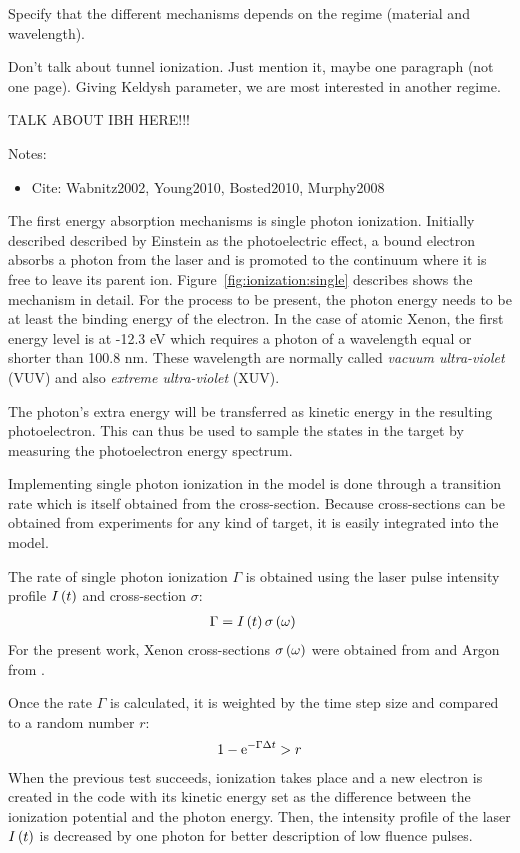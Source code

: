 Specify that the different mechanisms depends on the regime (material and
wavelength).

Don't talk about tunnel ionization. Just mention it, maybe one paragraph (not
one page). Giving Keldysh parameter, we are most interested in another regime.

TALK ABOUT IBH HERE!!!


Notes:
\begin{itemize}
\item Cite: Wabnitz2002, Young2010, Bosted2010, Murphy2008
\end{itemize}

The first energy absorption mechanisms is single photon ionization. Initially
described described by Einstein as the photoelectric effect, a bound electron
absorbs a photon from the laser and is promoted to the continuum where it is
free to leave its parent ion. Figure~\ref{fig:ionization:single} describes
shows the mechanism in detail. For the process to be present, the photon energy
needs to be at least the binding energy of the electron. In the case of
atomic Xenon, the first energy level is at -12.3 eV which requires a photon
of a wavelength equal or shorter than 100.8 nm. These wavelength are normally
called \textit{vacuum ultra-violet} (VUV) and also \textit{extreme
ultra-violet} (XUV).


The photon's extra energy will be transferred as kinetic energy in the
resulting photoelectron. This can thus be used to sample the states in the
target by measuring the photoelectron energy spectrum.

Implementing single photon ionization in the model is done through a
transition rate which is itself obtained from the cross-section. Because
cross-sections can be obtained from experiments for any kind of target, it is
easily integrated into the model.

The rate of single photon ionization $\Gamma$ is obtained using the laser
pulse intensity profile $I\left( t \right)$ and cross-section $\sigma$:
\begin{align}
\Gamma & = I\left( t \right) \sigma\left( \omega \right)
\end{align}
For the present work, Xenon cross-sections $\sigma\left( \omega \right)$ were obtained
from \cite{West1978} and Argon from \cite{Marr1976}.

Once the rate $\Gamma$ is calculated, it is weighted\cite{Lax2006} by the time
step size and compared to a random number $r$:
\begin{align}
1 - \textrm{e}^{-\Gamma \Delta t} > r
\end{align}
When the previous test succeeds, ionization takes place and a new electron is
created in the code with its kinetic energy set as the difference between the
ionization potential and the photon energy. Then, the intensity profile of the
laser $I\left( t \right)$ is decreased by one photon for better description of low fluence
pulses.





